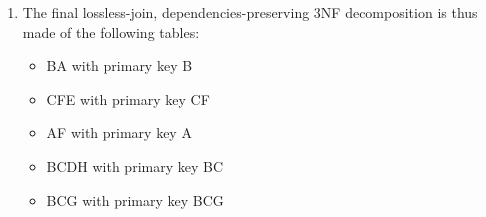 \documentclass[11pt]{article}
\begin{document}
\begin{enumerate}
\begin{enumerate}
\begin{enumerate}
\begin{enumerate}
            \end{enumerate}
        \end{enumerate}
        \item The final lossless-join, dependencies-preserving 3NF decomposition is thus made of the following tables:
        \begin{itemize}
            \item BA with primary key B
            \item CFE with primary key CF
            \item AF with primary key A
            \item BCDH with primary key BC
            \item BCG with primary key BCG
        \end{itemize}
    \end{enumerate}
   

\end{enumerate}
\end{document}
